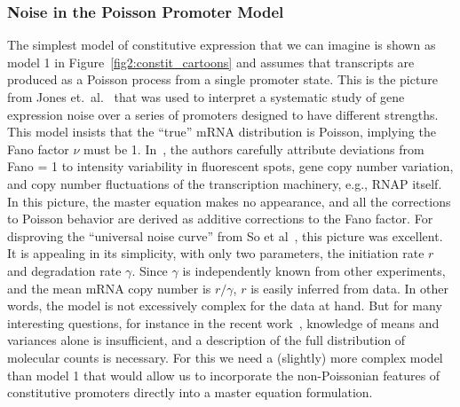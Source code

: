 \subsubsection{Noise in the Poisson Promoter Model}
The simplest model of constitutive expression that we can imagine
is shown as model 1 in Figure~\ref{fig2:constit_cartoons} and
assumes that
transcripts are produced as a Poisson process from a single promoter state. 
This is the picture from Jones et.\ al.~\cite{Jones2014} that was used to
interpret a systematic study of gene expression noise over a series of
promoters designed to have different strengths.   This
model insists that the ``true'' mRNA distribution is Poisson, implying the Fano
factor $\nu$ must be 1. In~\cite{Jones2014}, the authors carefully attribute
deviations from Fano = 1 to intensity variability in fluorescent spots, gene
copy number variation, and copy number fluctuations of the transcription
machinery, e.g., RNAP itself. In this picture, the master equation makes no
appearance, and all the corrections to Poisson behavior are derived as additive
corrections to the Fano factor. For disproving the ``universal noise curve''
from So et al~\cite{So2011}, this picture was excellent. It is appealing in its
simplicity, with only two parameters, the initiation rate $r$ and degradation
rate $\gamma$. Since $\gamma$ is independently known from other experiments, and
the mean mRNA copy number is $r/\gamma$, $r$ is easily inferred from data. In
other words, the model is not excessively complex for the data at hand. But for
many interesting questions, for instance in the recent work~, knowledge of means and variances alone is
insufficient, and a description of the full distribution of molecular counts is
necessary. For this we need a (slightly) more complex model than model 1 that
would allow us to incorporate the non-Poissonian features of constitutive
promoters directly into a master equation formulation.


